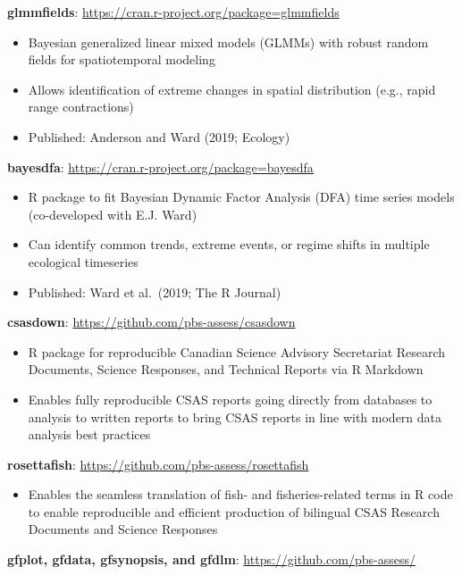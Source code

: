 \textbf{glmmfields}: \url{https://cran.r-project.org/package=glmmfields}

\begin{itemize}
\tightlist
\item
  Bayesian generalized linear mixed models (GLMMs) with robust random
  fields for spatiotemporal modeling
\item
  Allows identification of extreme changes in spatial distribution
  (e.g., rapid range contractions)
\item
  Published: Anderson and Ward (2019; Ecology)
\end{itemize}

\textbf{bayesdfa}: \url{https://cran.r-project.org/package=bayesdfa}

\begin{itemize}
\tightlist
\item
  R package to fit Bayesian Dynamic Factor Analysis (DFA) time series
  models (co-developed with E.J. Ward)
\item
  Can identify common trends, extreme events, or regime shifts in
  multiple ecological timeseries
\item
  Published: Ward et al.\ (2019; The R Journal)
\end{itemize}

\textbf{csasdown}: \url{https://github.com/pbs-assess/csasdown}

\begin{itemize}
\tightlist
\item
  R package for reproducible Canadian Science Advisory Secretariat
  Research Documents, Science Responses, and Technical Reports via R
  Markdown
\item
  Enables fully reproducible CSAS reports going directly from databases
  to analysis to written reports to bring CSAS reports in line with
  modern data analysis best practices
\end{itemize}

\textbf{rosettafish}: \url{https://github.com/pbs-assess/rosettafish}

\begin{itemize}
\tightlist
\item
  Enables the seamless translation of fish- and fisheries-related terms
  in R code to enable reproducible and efficient production of bilingual
  CSAS Research Documents and Science Responses
\end{itemize}

\textbf{gfplot, gfdata, gfsynopsis, and gfdlm}:
\url{https://github.com/pbs-assess/}

